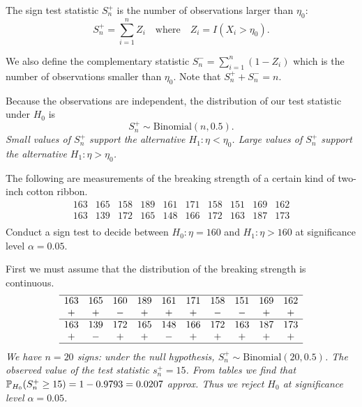 \begin{definition}
The sign test statistic $S^{+}_n$ is the number of observations larger than $\eta_0$: 
\[
S^{+}_n = \sum_{i=1}^n Z_i \quad\text{where}\quad Z_i=I(X_i>\eta_0).
\]
\end{definition}

We also define the complementary statistic $S^{-}_n = \displaystyle\sum_{i=1}^n (1-Z_i)$ which is the number of observations smaller than $\eta_0$. Note that $S^{+}_n + S^{-}_n = n$.

\bigskip
Because the observations are independent, the distribution of our test statistic under $H_0$ is
\[
S^{+}_n\sim\text{Binomial}(n,0.5).
\]
\bit
\it Small values of $S^{+}_n$ support the alternative $H_1:\eta < \eta_0$.
\it Large values of $S^{+}_n$ support the alternative $H_1:\eta > \eta_0$.
\eit

\begin{example}
The following are measurements of the breaking strength of a certain kind of two-inch cotton ribbon.
\[\begin{array}{cccccccccc}
163 & 165 & 158 & 189 & 161 & 171 & 158 & 151 & 169 & 162 \\
163 & 139 & 172 & 165 & 148 & 166 & 172 & 163 & 187 & 173 \\
\end{array}\]
Conduct a sign test to decide between $H_0:\eta=160$ and $H_1:\eta>160$ at significance level $\alpha=0.05$. 
\end{example}

\begin{solution}
First we must assume that the distribution of the breaking strength is continuous.
\small
\[\begin{array}{cccccccccc} \hline
163 & 165 & 160 & 189 & 161 & 171 & 158 & 151 & 169 & 162 \\
+ & + & - & + & + & + & - & - & + & + \\ \hline
163 & 139 & 172 & 165 & 148 & 166 & 172 & 163 & 187 & 173 \\
+ & - & + & + & - & + & + & + & + & + \\ \hline
\end{array}\]
\normalsize
\bit
\it We have $n=20$ signs: under the null hypothesis, $S^{+}_n\sim\text{Binomial}(20,0.5)$.
\it The observed value of the test statistic $s^{+}_n=15$. 
\it From tables we find that $\mathbb{P}_{H_0}(S^{+}_n\geq 15) = 1 - 0.9793 = 0.0207$ approx. 
\it Thus we reject $H_0$ at significance level $\alpha=0.05$.
\eit
\end{solution}

